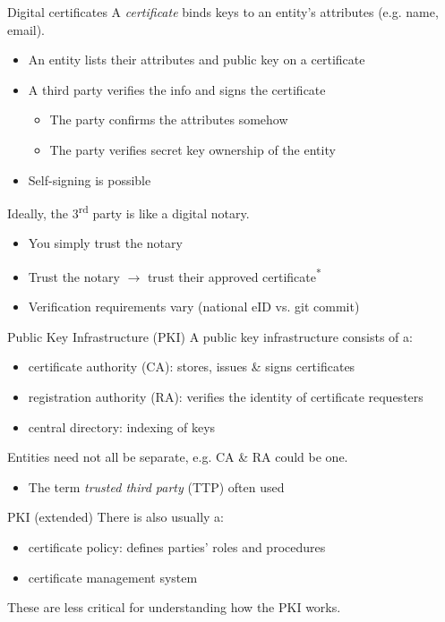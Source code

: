 \begin{frame}{Digital certificates}
  A \emph{certificate} binds keys to an entity's attributes (e.g. name, email).
  \begin{itemize}[<+(1)->]
    \item An entity lists their attributes and public key on a certificate
    \item A third party verifies the info and signs the certificate
    \begin{itemize}
      \item The party confirms the attributes somehow
      \item The party verifies secret key ownership of the entity
    \end{itemize}
    \item Self-signing is possible
  \end{itemize}

  \pause
  Ideally, the 3\textsuperscript{rd} party is like a digital notary.
  \begin{itemize}[<+(1)->]
    \item You simply trust the notary
    \item Trust the notary $\to$ trust their approved certificate\textsuperscript{*}
    \item Verification requirements vary (national eID vs. git commit)
  \end{itemize}
\end{frame}

\begin{frame}{Public Key Infrastructure (PKI)}
  A public key infrastructure consists of a:
  \begin{itemize}[<+(1)->]
    \item certificate authority (CA): stores, issues \& signs certificates
    \item registration authority (RA): verifies the identity of certificate requesters
    \item central directory: indexing of keys
  \end{itemize}

  \pause
  Entities need not all be separate, e.g. CA \& RA could be one.
  \begin{itemize}
    \item The term \emph{trusted third party} (TTP) often used
  \end{itemize}
\end{frame}

\begin{frame}{PKI (extended)}
  \pause
  There is also usually a:
  \begin{itemize}[<+(1)->]
    \item certificate policy: defines parties' roles and procedures
    \item certificate management system
  \end{itemize}

  \pause
  These are less critical for understanding how the PKI works.
\end{frame}

